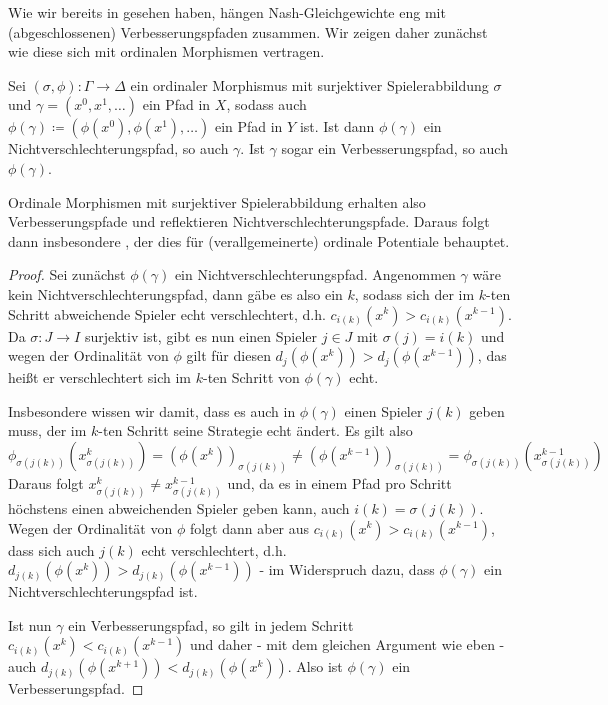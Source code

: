 Wie wir bereits in  gesehen haben, hängen Nash-Gleichgewichte eng mit (abgeschlossenen) Verbesserungspfaden zusammen. Wir zeigen daher zunächst wie diese sich mit ordinalen Morphismen vertragen.

\begin{prop}\label{prop:NVReflVerbErh}
	Sei $(\sigma, \phi): \Gamma \to \Delta$ ein ordinaler Morphismus mit surjektiver Spielerabbildung $\sigma$ und $\gamma = (x^0, x^1, \dots)$ ein Pfad in $X$, sodass auch $\phi(\gamma) \coloneqq (\phi(x^0), \phi(x^1), \dots)$ ein Pfad in $Y$ ist. Ist dann $\phi(\gamma)$ ein Nichtverschlechterungspfad, so auch $\gamma$. Ist $\gamma$ sogar ein Verbesserungspfad, so auch $\phi(\gamma)$.
\end{prop}

Ordinale Morphismen mit surjektiver Spielerabbildung erhalten also Verbesserungspfade und reflektieren Nichtverschlechterungspfade. Daraus folgt dann insbesondere , der dies für (verallgemeinerte) ordinale Potentiale behauptet.

\begin{proof}
	Sei zunächst $\phi(\gamma)$ ein Nichtverschlechterungspfad. Angenommen $\gamma$ wäre kein Nichtverschlechterungspfad, dann gäbe es also ein $k$, sodass sich der im $k$-ten Schritt abweichende Spieler echt verschlechtert, d.h. $c_{i(k)}(x^k) > c_{i(k)}(x^{k-1})$. Da $\sigma: J \to I$ surjektiv ist, gibt es nun einen Spieler $j \in J$ mit $\sigma(j) = i(k)$ und wegen der Ordinalität von $\phi$ gilt für diesen $d_j(\phi(x^k)) > d_j(\phi(x^{k-1}))$, das heißt er verschlechtert sich im $k$-ten Schritt von $\phi(\gamma)$ echt. 
	
	Insbesondere wissen wir damit, dass es auch in $\phi(\gamma)$ einen Spieler $j(k)$ geben muss, der im $k$-ten Schritt seine Strategie echt ändert. Es gilt also
		\[\phi_{\sigma(j(k))}\left(x_{\sigma(j(k))}^k\right) = \left(\phi(x^k)\right)_{\sigma(j(k))} \neq \left(\phi(x^{k-1})\right)_{\sigma(j(k))} = \phi_{\sigma(j(k))}\left(x_{\sigma(j(k))}^{k-1}\right)\]
	Daraus folgt $x_{\sigma(j(k))}^k \neq x_{\sigma(j(k))}^{k-1}$ und, da es in einem Pfad pro Schritt höchstens einen abweichenden Spieler geben kann, auch $i(k) = \sigma(j(k))$. Wegen der Ordinalität von $\phi$ folgt dann aber aus $c_{i(k)}(x^k) > c_{i(k)}(x^{k-1})$, dass sich auch $j(k)$ echt verschlechtert, d.h. $d_{j(k)}(\phi(x^k)) > d_{j(k)}(\phi(x^{k-1}))$ - im Widerspruch dazu, dass $\phi(\gamma)$ ein Nichtverschlechterungspfad ist.

	Ist nun $\gamma$ ein Verbesserungspfad, so gilt in jedem Schritt $c_{i(k)}(x^{k}) < c_{i(k)}(x^{k-1})$ und daher - mit dem gleichen Argument wie eben - auch $d_{j(k)}(\phi(x^{k+1})) < d_{j(k)}(\phi(x^k))$. Also ist $\phi(\gamma)$ ein Verbesserungspfad.
\end{proof}

